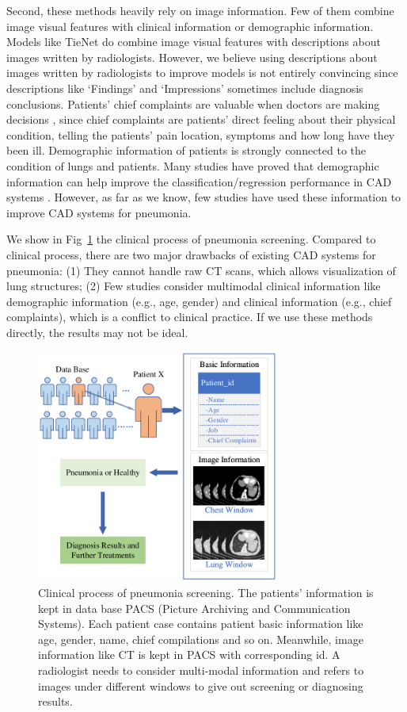 \documentclass[journal]{IEEEtran}
\begin{document}
Second, these methods heavily rely on image information. Few of them combine image visual features with clinical information or demographic information. Models like TieNet do combine image visual features with descriptions about images written by radiologists. However, we believe using descriptions about images written by radiologists to improve models is not entirely convincing since descriptions like `Findings' and `Impressions' sometimes include diagnosis conclusions. 
Patients' chief complaints are valuable when doctors are making decisions \cite{wu2018master}, since chief complaints are patients' direct feeling about their physical condition, telling the patients' pain location, symptoms and how long have they been ill. 
Demographic information of patients is strongly connected to the condition of lungs and patients. Many studies have proved that demographic information can help improve the classification/regression performance in CAD systems \cite{frisoni2010clinical, coupe2012simultaneous, moradi2015machine, liu2018joint}. However, as far as we know, few studies have used these information to improve CAD systems for pneumonia. 

We show in Fig~\ref{clinicalprocess} the clinical process of pneumonia screening. Compared to clinical process, there are two major drawbacks of existing CAD systems for pneumonia: (1) They cannot handle raw CT scans, which allows visualization of lung structures; (2) Few studies consider multimodal clinical information like demographic information (e.g., age, gender) and clinical information (e.g., chief complaints), which is a conflict to clinical practice. If we use these methods directly, the results may not be ideal. 
\begin{figure}[htbp]
    \centerline{\includegraphics[width=80mm]{clinicalprocess.pdf}}
    \vspace{-0cm}
    \caption{Clinical process of pneumonia screening. The patients' information is kept in data base PACS (Picture Archiving and Communication Systems). Each patient case contains patient basic information like age, gender, name, chief compilations and so on. Meanwhile, image information like CT is kept in PACS with corresponding id. A radiologist needs to consider multi-modal information and refers to images under different windows to give out screening or diagnosing results.}
    \vspace{-0cm}
    \label{clinicalprocess}
    \end{figure}
\end{document}
